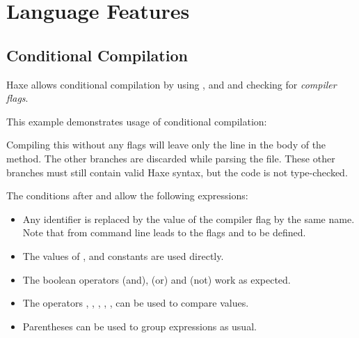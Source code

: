 \chapter{Language Features}
\label{lf}

\section{Conditional Compilation}
\label{lf-condition-compilation}

Haxe allows conditional compilation by using ,  and  and checking for \emph{compiler flags}.


This example demonstrates usage of conditional compilation:


Compiling this without any flags will leave only the  line in the body of the  method. The other branches are discarded while parsing the file. These other branches must still contain valid Haxe syntax, but the code is not type-checked.

The conditions after  and  allow the following expressions:

\begin{itemize}
	\item Any identifier is replaced by the value of the compiler flag by the same name. Note that  from command line leads to the flags  and  to be defined.
	\item The values of ,  and  constants are used directly.
	\item The boolean operators \expr{\&\&} (and), \expr{||} (or) and \expr{!} (not) work as expected.
	\item The operators \expr{==}, \expr{!=}, \expr{>}, \expr{>=}, \expr{<}, \expr{<=} can be used to compare values.
	\item Parentheses \expr{()} can be used to group expressions as usual.
\end{itemize}

